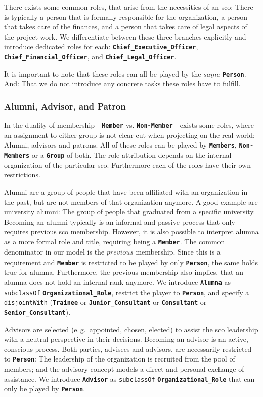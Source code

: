 \documentclass[a4paper, DIV=13, BCOR=0cm]{scrbook}
\newcommand{\eg}{e.\,g.\ }
\newcommand{\class}[1]{\texttt{\textbf{#1}}}
\newcommand{\relation}[1]{\texttt{#1}}
\begin{document}
There exists some common roles, that arise from the necessities of an \gls{sco}: There is typically a person that is formally responsible for the organization, a person that takes care of the finances, and a person that takes care of legal aspects of the project work. We differentiate between these three branches explicitly and introduce dedicated roles for each: \class{Chief\_Executive\_Officer}, \class{Chief\_Financial\_Officer}, and \class{Chief\_Legal\_Officer}.

It is important to note that these roles can all be played by the $\underline{same}$ \class{Person}. And: That we do not introduce any concrete tasks these roles have to fulfill.

\subsubsection{Alumni, Advisor, and Patron}
In the duality of membership---\class{Member} vs. \class{Non-Member}---exists some roles, where an assignment to either group is not clear cut when projecting on the real world: Alumni, advisors and patrons. All of these roles can be played by \class{Members}, \class{Non-Members} or a \class{Group} of both. The role attribution depends on the internal organization of the particular \gls{sco}. Furthermore each of the roles have their own restrictions.

Alumni are a group of people that have been affiliated with an organization in the past, but are not members of that organization anymore. A good example are university alumni: The group of people that graduated from a specific university. Becoming an alumni typically is an informal and passive process that only requires previous \gls{sco} membership. However, it is also possible to interpret alumna as a more formal role and title, requiring being a \class{Member}. The common denominator in our model is the $\underline{previous}$ membership. Since this is a requirement and \class{Member} is restricted to be played by only \class{Person}, the same holds true for alumna. Furthermore, the previous membership also implies, that an alumna does not hold an internal rank anymore. We introduce \class{Alumna} as \relation{subclassOf} \class{Organizational\_Role}, restrict the player to \class{Person}, and specify a \relation{disjointWith} (\class{Trainee} or \class{Junior\_Consultant} or \class{Consultant} or \class{Senior\_Consultant}).

Advisors are selected (\eg appointed, chosen, elected) to assist the \gls{sco} leadership with a neutral perspective in their decisions. Becoming an advisor is an active, conscious process. Both parties, advisees and advisors, are necessarily restricted to \class{Person}: The leadership of the organization is recruited from the pool of members; and the advisory concept models a direct and personal exchange of assistance. We introduce \class{Advisor} as \relation{subclassOf} \class{Organizational\_Role} that can only be played by \class{Person}.
\end{document}
